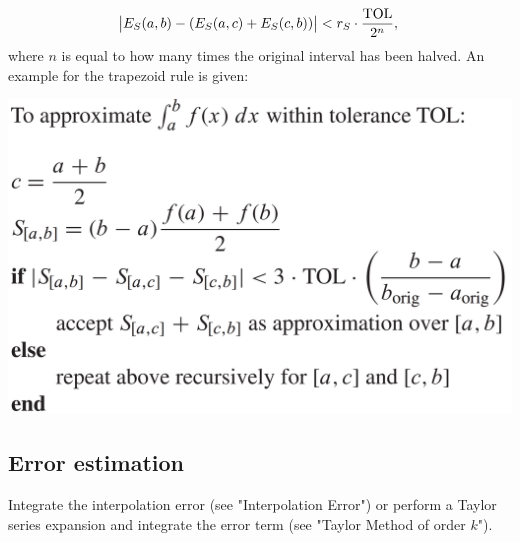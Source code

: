 $$
\abs{E_S(a,b) - (E_S(a,c) + E_S(c,b))} < r_S \cdot \frac{\text{TOL}}{2^n},
$$
where $n$ is equal to how many times the original interval has been halved. An example for the trapezoid rule is given:
\begin{center}
\includegraphics[scale=0.18]{images/adaptive_quadrature.png}
\end{center}

\subsection{Error estimation}
Integrate the interpolation error (see "Interpolation Error") or perform a Taylor series expansion and integrate the error term (see "Taylor Method of order $k$"). 